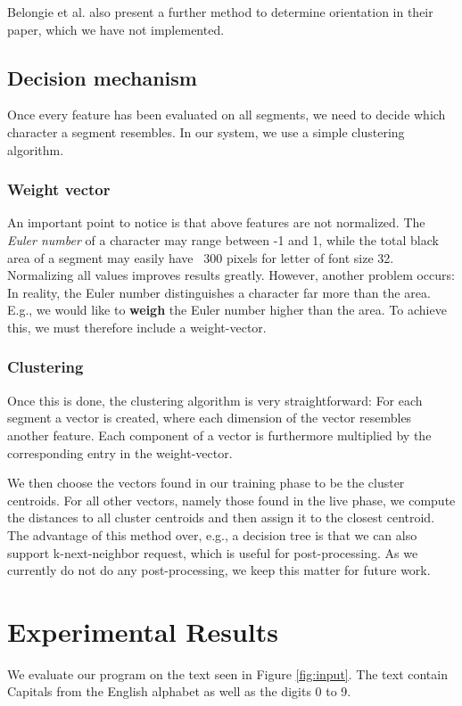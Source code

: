 \documentclass{article}
\begin{document}
Belongie et al. also present a further method to determine orientation in their paper, which we have not implemented.

\subsection{Decision mechanism}
Once every feature has been evaluated on all segments, we need to decide which character a segment resembles. In our system, we use a simple clustering algorithm.

\subsubsection{Weight vector}
An important point to notice is that above features are not normalized. The \textit{Euler number} of a character may range between -1 and 1, while the total black area of a segment may easily have ~300 pixels for letter of font size 32. Normalizing all values improves results greatly. However, another problem occurs: In reality, the Euler number distinguishes a character far more than the area. E.g., we would like to \textbf{weigh} the Euler number higher than the area. To achieve this, we must therefore include a weight-vector. 

\subsubsection{Clustering}

Once this is done, the clustering algorithm is very straightforward: For each segment a vector is created, where each dimension of the vector resembles another feature. Each component of a vector is furthermore multiplied by the corresponding entry in the weight-vector. 

We then choose the vectors found in our training phase to be the cluster centroids. For all other vectors, namely those found in the live phase, we compute the distances to all cluster centroids and then assign it to the closest centroid. The advantage of this method over, e.g., a decision tree is that we can also support k-next-neighbor request, which is useful for post-processing. As we currently do not do any post-processing, we keep this matter for future work.

\section{Experimental Results}
\label{sec:evaluation}
We evaluate our program on the text seen in Figure \ref{fig:input}. The text contain Capitals from the English alphabet as well as the digits 0 to 9.
\end{document}
